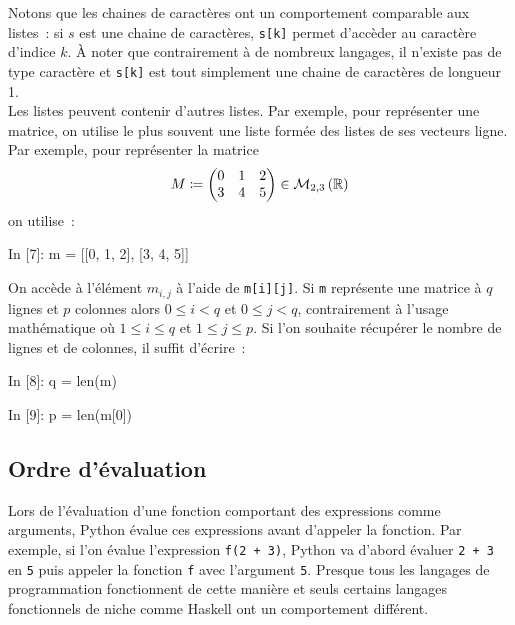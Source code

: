 \documentclass{magnolia}
\begin{document}
Notons 
que les chaines de caractères ont un comportement comparable aux listes~: si $s$ est une chaine de
caractères, \verb!s[k]! permet d'accèder au caractère d'indice $k$. À noter que contrairement à de nombreux
langages, il n'existe pas de type \og caractère \fg et \verb!s[k]! est tout simplement une chaine de
caractères de longueur 1.\\



Les listes peuvent contenir d'autres listes.
Par exemple, pour représenter une matrice, on utilise le plus souvent une liste
formée des listes de ses vecteurs ligne. Par exemple, pour représenter
la matrice
\[M\coloneqq\begin{pmatrix}
  0 & 1 & 2\\
  3 & 4 & 5
\end{pmatrix}\in\mathcal{M}_{2,3}\left(\mathbb{R}\right)\]
on utilise~:
\begin{pythoncode}
In [7]: m = [[0, 1, 2], [3, 4, 5]]
\end{pythoncode}
On accède à l'élément $m_{i,j}$ à l'aide de
\verb!m[i][j]!. Si \verb!m! représente une matrice à $q$ lignes et
$p$ colonnes alors $0\leq i<q$ et $0\leq j <q$, contrairement à l'usage
mathématique où $1\leq i\leq q$ et $1\leq j\leq p$. Si l'on souhaite
récupérer le nombre de lignes et de colonnes, il suffit d'écrire~:
\begin{pythoncode}
In [8]: q = len(m)

In [9]: p = len(m[0])
\end{pythoncode}


\subsection{Ordre d'évaluation}

Lors de l'évaluation d'une fonction comportant des expressions comme arguments, Python évalue ces
expressions avant d'appeler la fonction. Par exemple, si l'on évalue
l'expression \verb_f(2 + 3)_, Python va d'abord évaluer \verb_2 + 3_ en \verb_5_
puis appeler la fonction \verb_f_ avec l'argument \verb_5_. Presque tous les langages
de programmation fonctionnent de cette manière et seuls certains langages fonctionnels
de niche comme Haskell ont un comportement différent. \\
\end{document}
